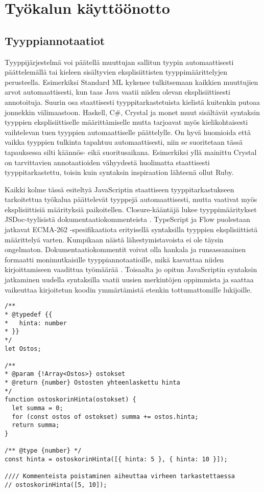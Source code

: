 \chapter{Työkalun käyttöönotto}

\section{Tyyppiannotaatiot}

Tyyppijärjestelmä voi päätellä muuttujan sallitun tyypin automaattisesti
päättelemällä tai kieleen sisältyvien eksplisiittisten tyyppimäärittelyjen
perusteella. Esimerkiksi Standard ML kykenee tulkitsemaan kaikkien muuttujien
arvot automaattisesti, kun taas Java vaatii niiden olevan eksplisiittisesti
annotoituja. Suurin osa staattisesti tyyppitarkastetuista kielistä kuitenkin
putoaa jonnekkin välimaastoon. Haskell, C\#, Crystal ja monet muut sisältävät
syntaksin tyyppien eksplisiittiselle määrittämiselle mutta tarjoavat myös
kielikohtaisesti vaihtelevan tuen tyyppien automaattiselle päättelylle.
On hyvä huomioida että vaikka tyyppien tulkinta tapahtuu automaattisesti,
niin se suoritetaan tässä tapauksessa silti käännös- eikä suoritusaikana.
Esimerkiksi yllä mainittu Crystal on tarvittavien annotaatioiden vähyydestä
huolimatta staattisesti tyyppitarkastettu, toisin kuin syntaksin inspiraation
lähteenä ollut Ruby.

Kaikki kolme tässä esiteltyä JavaScriptin staattiseen tyyppitarkastukseen
tarkoitettua työkalua päättelevät tyyppejä automaattisesti, mutta vaativat
myös eksplisiittisiä määrityksiä paikoitellen. Closure-kääntäjä lukee
tyyppimääritykset JSDoc-tyylisistä dokumentaatiokommenteista \cite{annotatingJSforClosure}.
TypeScript ja Flow puolestaan jatkavat ECMA-262 -spesifikaatiota erityisellä syntaksilla
tyyppien eksplisiittistä määrittelyä varten. Kumpikaan näistä
lähestymistavoista ei ole täysin ongelmaton. Dokumentaatiokommentit voivat
olla hankala ja runsassanainen formaatti monimutkaisille tyyppiannotaatioille,
mikä kasvattaa niiden kirjoittamiseen vaadittua työmäärää \cite{TypeScriptatBuild}.
Toisaalta jo opitun JavaScriptin syntaksin jatkaminen uudella syntaksilla
vaatii uusien merkintöjen oppimmista ja saattaa vaikeuttaa kirjoitetun koodin
ymmärtämistä etenkin tottumattomille lukijoille.

\begin{minipage}{\linewidth}
\begin{lstlisting}[caption={Esimerkki Closure-annotaatiosta funktiolle},label={lst:ostoskorin_hinta_clojure}]
/**
* @typedef {{
*   hinta: number
* }}
*/
let Ostos;

/**
* @param {!Array<Ostos>} ostokset
* @return {number} Ostosten yhteenlaskettu hinta
*/
function ostoskorinHinta(ostokset) {
  let summa = 0;
  for (const ostos of ostokset) summa += ostos.hinta;
  return summa;
}

/** @type {number} */
const hinta = ostoskorinHinta([{ hinta: 5 }, { hinta: 10 }]);

//// Kommenteista poistaminen aiheuttaa virheen tarkastettaessa
// ostoskorinHinta([5, 10]);
\end{lstlisting}
\end{minipage}


